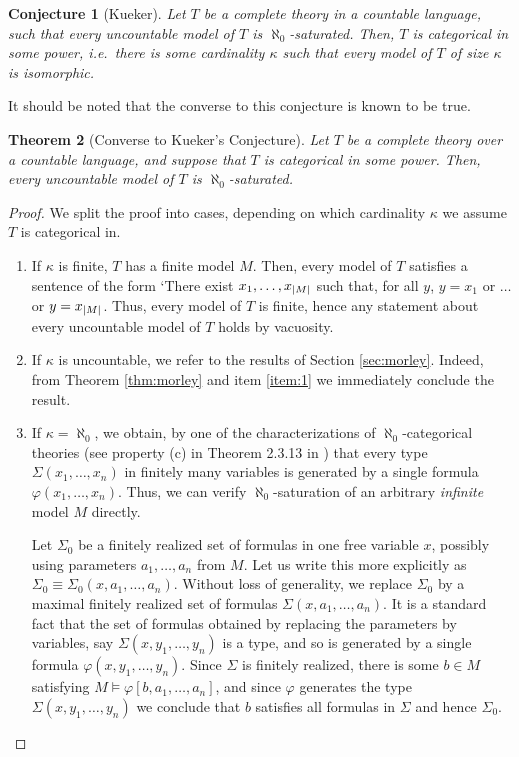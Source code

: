 \documentclass{article}
\newtheorem{theorem}{Theorem}[section]
\newtheorem{conjecture}[theorem]{Conjecture}
\theoremstyle{nonumberplain}
\newtheorem{proof}{Proof}
\DeclarePairedDelimiter{\card}{\lvert}{\rvert}
\begin{document}
\begin{conjecture}[Kueker]
Let $T$ be a complete theory in a countable language, such that every uncountable model of $T$ is $\aleph_0$-saturated. Then, $T$ is categorical in some power, i.e.\ there is some cardinality $\kappa$ such that every model of $T$ of size $\kappa$ is isomorphic.
\end{conjecture}

It should be noted that the converse to this conjecture is known to be true.

\begin{theorem}[Converse to Kueker's Conjecture]
Let $T$ be a complete theory over a countable language, and suppose that $T$ is categorical in some power. Then, every uncountable model of $T$ is $\aleph_0$-saturated.
\end{theorem}

\begin{proof}
We split the proof into cases, depending on which cardinality $\kappa$ we assume $T$ is categorical in.
\begin{enumerate}[label=(\roman*)]
\item If $\kappa$ is finite, $T$ has a finite model $M$. Then, every model of $T$ satisfies a sentence of the form `There exist $x_1, \dots, x_{\card M}$ such that, for all $y$, $y = x_1$ or $\dots$ or $y = x_{\card M}$. Thus, every model of $T$ is finite, hence any statement about every uncountable model of $T$ holds by vacuosity.

\item If $\kappa$ is uncountable, we refer to the results of Section \ref{sec:morley}. Indeed, from Theorem \ref{thm:morley} and item \ref{item:1} we immediately conclude the result.

\item If $\kappa = \aleph_0$, we obtain, by one of the characterizations of $\aleph_0$-categorical theories (see property (c) in Theorem 2.3.13 in \cite{cnk}) that every type $\Sigma(x_1, \dots, x_n)$ in finitely many variables is generated by a single formula $\varphi(x_1, \dots, x_n)$. Thus, we can verify $\aleph_0$-saturation of an arbitrary \emph{infinite} model $M$ directly.

Let $\Sigma_0$ be a finitely realized set of formulas in one free variable $x$, possibly using parameters $a_1, \dots, a_n$ from $M$. Let us write this more explicitly as $\Sigma_0 \equiv \Sigma_0(x,a_1,\dots,a_n)$. Without loss of generality, we replace $\Sigma_0$ by a maximal finitely realized set of formulas $\Sigma(x,a_1, \dots, a_n)$. It is a standard fact that the set of formulas obtained by replacing the parameters by variables, say $\Sigma(x,y_1,\dots,y_n)$ is a type, and so is generated by a single formula $\varphi(x,y_1, \dots, y_n)$. Since $\Sigma$ is finitely realized, there is some $b \in M$ satisfying $M \vDash \varphi[b,a_1,\dots,a_n]$, and since $\varphi$ generates the type $\Sigma(x,y_1,\dots,y_n)$ we conclude that $b$ satisfies all formulas in $\Sigma$ and hence $\Sigma_0$.
\end{enumerate}
\end{proof}
\end{document}
